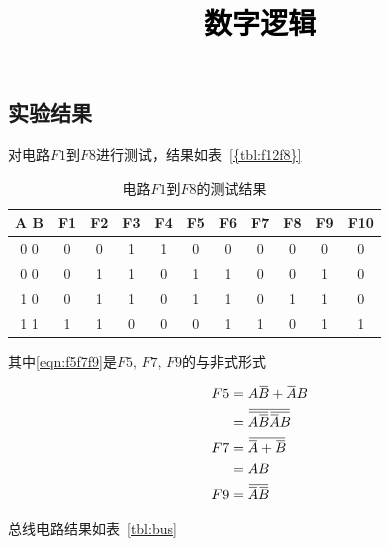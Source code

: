 \documentclass[a4paper,twoside]{ctexart}
\newcommand{\PaperTitle}{数字逻辑}  %
\newcommand{\ols}[1]{\mskip.5\thinmuskip\overline{\mskip-.5\thinmuskip {#1} \mskip-.5\thinmuskip}\mskip.5\thinmuskip}
\begin{document}
\newpage

\title{
	\Large{\textcolor{black}{\PaperTitle}}
}
 
\newpage
\setcounter{page}{1}

\begin{spacing}{1.2}


\setcounter{section}{3}

\section{实验结果}

对电路$F1$到$F8$进行测试，结果如表~\ref{{tbl:f12f8}}

\begin{table}[htbp]
	\centering
	\label{tbl:f12f8}
	\caption{电路$F1$到$F8$的测试结果}
	\begin{tabular}{c|cccccccccc}
		\toprule
		\hline
		A\hspace{1em} B&F1&F2&F3&F4&F5&F6&F7&F8&F9&F10\\
		\hline
		0\hspace{1em} 0&0&0&1&1&0&0&0&0&0&0\\
		0\hspace{1em} 0&0&1&1&0&1&1&0&0&1&0\\
		1\hspace{1em} 0&0&1&1&0&1&1&0&1&1&0\\
		1\hspace{1em} 1&1&1&0&0&0&1&1&0&1&1\\
		\hline
		\bottomrule
	\end{tabular}
\end{table}

其中\eqref{eqn:f5f7f9}是$F5$, $F7$, $F9$的与非式形式

\begin{equation}
	\label{eqn:f5f7f9}
	\begin{aligned}
		F5&=A\ols{B}+\ols{A}B \\
		&=\ols{\ols{A\ols{B}} \ols{\ols{A}B}} \\
		F7&=\ols{\ols{A}+\ols{B}} \\
		&=AB \\
		F9&=\ols{\ols{A}\ols{B}} \\
	\end{aligned}
\end{equation}

总线电路结果如表~\ref{tbl:bus}


\end{spacing}
\end{document}
